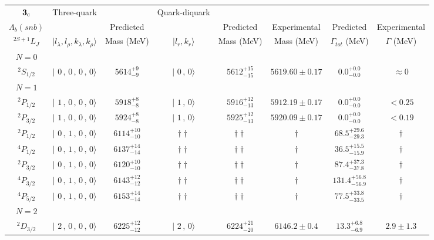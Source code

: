 \begin{tabular}{c| c c c c c c c}\hline \hline
${\bf {3}}_{\rm c}$  & Three-quark & & Quark-diquark   &             &      &        &  \\ 
$\Lambda_{b}(snb)$ &   & Predicted  &   &  Predicted   &  Experimental &  Predicted            & Experimental \\ 
 $^{2S+1}L_{J}$ & $\vert l_{\lambda}, l_{\rho}, k_{\lambda}, k_{\rho} \rangle$ & Mass (MeV)  & $\vert l_{r}, k_{r} \rangle$  &  Mass (MeV)   &  Mass (MeV)   &  $\Gamma_{tot}$ (MeV) & $\Gamma$ (MeV) \\ \hline
\hline
 $N=0$  &  &  &  &  &  \\ 
$^{2}S_{1/2}$ & $\vert \,\,0\,,\,0\,,\,0\,,\,0 \rangle $ & $5614^{+9}_{-9}$ & $\vert \,\,0\,,\,0 \rangle$ & $5612^{+15}_{-15}$ & $5619.60\pm 0.17$ & $0.0^{+0.0}_{-0.0}$ & $\approx 0$ \\ 
\hline
 $N=1$  &  &  &  &  &  \\ 
$^{2}P_{1/2}$ & $\vert \,\,1\,,\,0\,,\,0\,,\,0 \rangle $ & $5918^{+8}_{-8}$ & $\vert \,\,1\,,\,0 \rangle$ & $5916^{+12}_{-13}$ & $5912.19\pm 0.17$ & $0.0^{+0.0}_{-0.0}$ & $<0.25$ \\ 
$^{2}P_{3/2}$ & $\vert \,\,1\,,\,0\,,\,0\,,\,0 \rangle $ & $5924^{+8}_{-8}$ & $\vert \,\,1\,,\,0 \rangle$ & $5925^{+12}_{-13}$ & $5920.09\pm 0.17$ & $0.0^{+0.0}_{-0.0}$ & $<0.19$ \\ 
$^{2}P_{1/2}$ & $\vert \,\,0\,,\,1\,,\,0\,,\,0 \rangle $ & $6114^{+10}_{-10}$ & $\dagger\dagger$ & $\dagger\dagger$ & $\dagger$ & $68.5^{+29.6}_{-29.3}$ & $\dagger$ \\ 
$^{4}P_{1/2}$ & $\vert \,\,0\,,\,1\,,\,0\,,\,0 \rangle $ & $6137^{+14}_{-14}$ & $\dagger\dagger$ & $\dagger\dagger$ & $\dagger$ & $36.5^{+15.5}_{-15.9}$ & $\dagger$ \\ 
$^{2}P_{3/2}$ & $\vert \,\,0\,,\,1\,,\,0\,,\,0 \rangle $ & $6120^{+10}_{-10}$ & $\dagger\dagger$ & $\dagger\dagger$ & $\dagger$ & $87.4^{+37.3}_{-37.8}$ & $\dagger$ \\ 
$^{4}P_{3/2}$ & $\vert \,\,0\,,\,1\,,\,0\,,\,0 \rangle $ & $6143^{+12}_{-12}$ & $\dagger\dagger$ & $\dagger\dagger$ & $\dagger$ & $131.4^{+56.8}_{-56.9}$ & $\dagger$ \\ 
$^{4}P_{5/2}$ & $\vert \,\,0\,,\,1\,,\,0\,,\,0 \rangle $ & $6153^{+14}_{-14}$ & $\dagger\dagger$ & $\dagger\dagger$ & $\dagger$ & $77.5^{+33.8}_{-33.5}$ & $\dagger$ \\ 
\hline
 $N=2$  &  &  &  &  &  \\ 
$^{2}D_{3/2}$ & $\vert \,\,2\,,\,0\,,\,0\,,\,0 \rangle $ & $6225^{+12}_{-12}$ & $\vert \,\,2\,,\,0 \rangle$ & $6224^{+21}_{-20}$ & $6146.2\pm 0.4$ & $13.3^{+6.8}_{-6.9}$ & $2.9\pm 1.3$ \\ 

\end{tabular}
